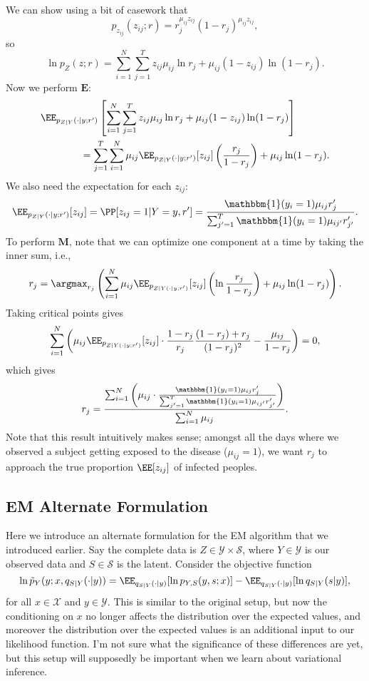 \noindent We can show using a bit of casework that 
\[p_{z_{ij}}(z_{ij};r) = r_j^{\mu_{ij}z_{ij}}(1-r_j)^{\mu_{ij}z_{ij}},\] 
so 
\[\ln p_Z(z;r) = \sum_{i=1}^N\sum_{j=1}^T z_{ij}\mu_{ij}\ln r_j + \mu_{ij}(1-z_{ij})\ln (1-r_j).\] 
Now we perform $\mathbf{E}$: 
\begin{align*}
	&\EE_{p_{Z|Y}(\cdot | y;r')}\left[\sum_{i=1}^N\sum_{j=1}^Tz_{ij}\mu_{ij}\ln r_j + \mu_{ij}(1-z_{ij})\ln (1-r_j)\right] \\
	&\qquad\qquad= \sum_{j=1}^T\sum_{i=1}^N \mu_{ij}\EE_{p_{Z|Y}(\cdot | y;r')}[z_{ij}]\left(\frac{r_j}{1-r_j}\right) + \mu_{ij}\ln (1-r_j).
\end{align*}
We also need the expectation for each $z_{ij}$: 
\begin{align*}
	\EE_{p_{Z|Y}(\cdot | y;r')}[z_{ij}] = \PP[z_{ij}=1|Y=y,r'] = \frac{\mathbbm{1}(y_i=1)\mu_{ij}r_j'}{\sum_{j'=1}^T\mathbbm{1}(y_i=1)\mu_{ij'}r_{j'}'}.
\end{align*}
To perform $\mathbf{M}$, note that we can optimize one component at a time by taking the inner sum, i.e., 
\[r_j = \argmax_{r_j}\left(\sum_{i=1}^N\mu_{ij}\EE_{p_{Z|Y(\cdot | y;r')}}[z_{ij}]\left(\ln \frac{r_j}{1-r_j}\right) + \mu_{ij}\ln (1-r_j)\right).\] 
Taking critical points gives
\[\sum_{i=1}^N\left(\mu_{ij}\EE_{p_{Z|Y(\cdot | y;r')}}[z_{ij}]\cdot \frac{1-r_j}{r_j}\frac{(1-r_j) + r_j}{(1-r_j)^2} - \frac{\mu_{ij}}{1-r_j}\right) = 0,\] 
which gives
\[r_j = \frac{\sum_{i=1}^N\left(\mu_{ij}\cdot \frac{\mathbbm{1}(y_i=1)\mu_{ij}r_j'}{\sum_{j'=1}^T\mathbbm{1}(y_i=1)\mu_{ij'}r_{j'}'}\right)}{\sum_{i=1}^N\mu_{ij}}.\] 
Note that this result intuitively makes sense; amongst all the days where we observed a subject getting exposed to the disease ($\mu_{ij}=1$), we want $r_j$ to approach the true proportion $\EE[z_{ij}]$ of infected peoples. 

\subsection{EM Alternate Formulation}

Here we introduce an alternate formulation for the EM algorithm that we introduced earlier. Say the complete data is $Z\in \mathcal{Y}\times \mathcal{S}$, where $Y\in \mathcal{Y}$ is our observed data and $S\in \mathcal{S}$ is the latent. Consider the objective function 
\[\ln \tilde{p}_{Y}(y;x,q_{S|Y}(\cdot|y)) = \EE_{q_{S|Y}(\cdot | y)}[\ln p_{Y,S}(y,s;x)] - \EE_{q_{S|Y}(\cdot | y)}[\ln q_{S|Y}(s|y)],\] 
for all $x\in \mathcal{X}$ and $y\in \mathcal{Y}$. This is similar to the original setup, but now the conditioning on $x$ no longer affects the distribution over the expected values, and moreover the distribution over the expected values is an additional input to our likelihood function. I'm not sure what the significance of these differences are yet, but this setup will supposedly be important when we learn about variational inference. 

